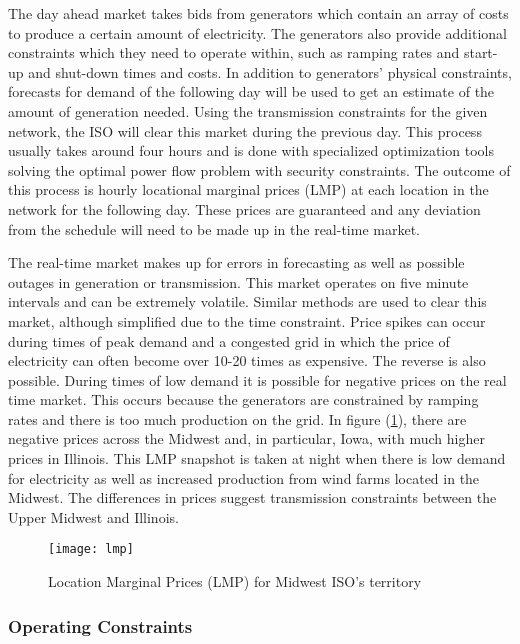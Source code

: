 The day ahead market takes bids from generators which contain an array of costs to produce a certain amount of electricity.  The generators also provide additional constraints which they need to operate within, such as ramping rates and start-up and shut-down times and costs.  In addition to generators' physical constraints, forecasts for demand of the following day will be used to get an estimate of the amount of generation needed.  Using the transmission constraints for the given network, the ISO will clear this market during the previous day.  This process usually takes around four hours and is done with specialized optimization tools solving the optimal power flow problem with security constraints.  The outcome of this process is hourly locational marginal prices (LMP) at each location in the network for the following day.  These prices are guaranteed and any deviation from the schedule will need to be made up in the real-time market.	

The real-time market makes up for errors in forecasting as well as possible outages in generation or transmission.  This market operates on five minute intervals and can be extremely volatile.  Similar methods are used to clear this market, although simplified due to the time constraint.  Price spikes can occur during times of peak demand and a congested grid in which the price of electricity can often become over 10-20 times as expensive.  The reverse is also possible.  During times of low demand it is possible for negative prices on the real time market.  This occurs because the generators are constrained by ramping rates and there is too much production on the grid. In figure (\ref{fig:lmpmiso}), there are negative prices across the Midwest and, in particular, Iowa, with much higher prices in Illinois.  This LMP snapshot is taken at night when there is low demand for electricity as well as increased production from wind farms located in the Midwest.  The differences in prices suggest transmission constraints between the Upper Midwest and Illinois.   


\begin{figure}
\centering
\texttt{[image: lmp]}  
\caption{Location Marginal Prices (LMP) for Midwest ISO's territory}
\label{fig:lmpmiso}
\end{figure}


\subsubsection{Operating Constraints}

